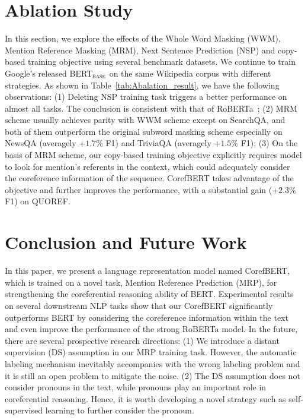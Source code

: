 \documentclass[11pt,a4paper]{article}
\newcommand\CorefBERT{CorefBERT\xspace}
\newcommand\BASESIZE{$_{\small \textsc{base}}$\xspace}
\begin{document}
\section{Ablation Study}



In this section, we explore the effects of the Whole Word Masking (WWM), Mention Reference Masking (MRM), Next Sentence Prediction (NSP) and copy-based training objective using several benchmark datasets. We continue to train Google's released BERT\BASESIZE on the same Wikipedia corpus with different strategies. As shown in Table~\ref{tab:Abalation_result}, we have the following observations: (1) Deleting NSP training task triggers a better performance on almost all tasks. The conclusion is consistent with that of RoBERTa~\citep{Roberta}; (2) MRM scheme usually achieves parity with WWM scheme except on SearchQA, and both of them outperform the original subword masking scheme especially on NewsQA (averagely +$1.7\%$ F1) and TriviaQA (averagely +$1.5\%$ F1); (3) On the basis of MRM scheme, our copy-based training objective explicitly requires  model to look for mention's referents in the context, which could adequately consider the coreference information of the sequence. \CorefBERT takes advantage of the objective and further improves the performance, with a substantial gain (+$2.3\%$ F1) on QUOREF.









\section{Conclusion and Future Work}

In this paper, we present a language representation model named \CorefBERT, which is trained on a novel task, Mention Reference Prediction (MRP),  for strengthening the coreferential reasoning ability of BERT. 
Experimental results on several downstream NLP tasks show that our \CorefBERT significantly outperforms BERT by considering the coreference information within the text and even improve the performance of the strong RoBERTa model. In the future, there are several prospective research directions: (1) We introduce a distant supervision (DS) assumption in our MRP training task. However, the automatic labeling mechanism inevitably accompanies with the wrong labeling problem and it is still an open problem to mitigate the noise.
(2) The DS assumption does not consider  pronouns in the text, while  pronouns play an important role in coreferential reasoning. Hence, it is worth developing a novel strategy such as self-supervised learning to further consider the pronoun.
\end{document}
